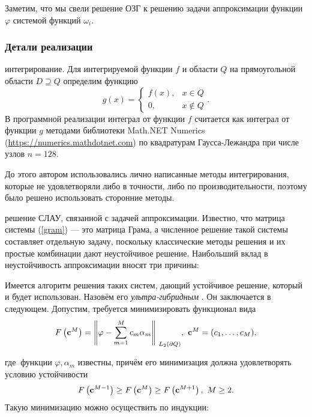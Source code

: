 \documentclass[a4paper]{article}
\begin{document}
Заметим, что мы свели решение ОЗГ к решению задачи аппроксимации функции $\varphi$ системой функций $\omega_i$.

\subsubsection{Детали реализации}
{ интегрирование}. Для интегрируемой функции $f$ и области $Q$ на прямоугольной области $D \supseteq Q$ определим функцию
\begin{equation*}
  g(x)=
  \begin{cases}
    f(x), & x \in Q      \\
    0,    & x \not \in Q
  \end{cases}.
\end{equation*}
В программной реализации интеграл от функции $f$ считается как интеграл от функции $g$ методами библиотеки Math.NET Numerics (\url{https://numerics.mathdotnet.com})
по квадратурам Гаусса-Лежандра при числе узлов $n=128$.

До этого автором использовались лично написанные методы интегрирования, которые  не удовлетворяли либо в точности, либо по производительности, поэтому было решено использовать сторонние методы.

{ решение СЛАУ, связанной с задачей аппроксимации}. Известно, что матрица системы (\ref{gram}) --- это матрица Грама, а численное решение такой системы составляет отдельную задачу, поскольку классические методы решения и их простые комбинации дают неустойчивое решение.
Наибольший вклад в неустойчивость аппроксимации вносят три причины:

Имеется алгоритм решения таких систем, дающий устойчивое решение, который и будет использован.
Назовём его {\it ультра-гибридным} .
Он заключается в следующем. Допустим, требуется минимизировать функционал вида
\begin{equation}
  F\left({\bf c}^M\right)={\left\|\varphi -\sum^M_{m=1}{c_m}{\alpha }_m\right\|}_{{\ L}_2\left(\partial Q\right)},\ {\bf c}^M=(c_1,\dots,c_M),
\end{equation}

где $\ \text{функции } \varphi, \alpha_m \text{ известны}$,
причём его минимизация должна удовлетворять условию устойчивости
\begin{equation}F\left({\bf c}^{M-1}\right)\ge F\left({\bf c}^M\right)\ge F\left({\bf c}^{M+1}\right),\ M\ge 2.
\end{equation}
Такую минимизацию можно осуществить по индукции:
\end{document}

